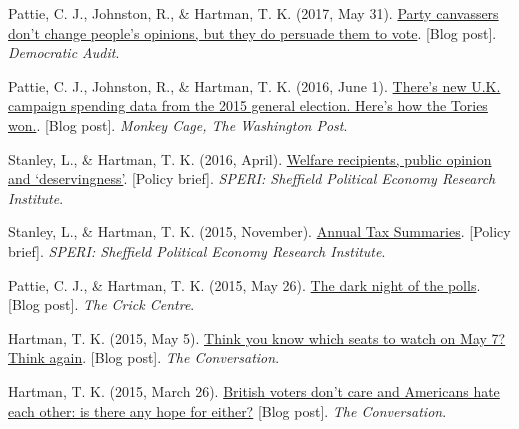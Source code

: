 \documentclass[12pt]{article}
\begin{document}
\begin{bibenum}
	\item Pattie, C. J., Johnston, R., \& Hartman, T. K. (2017, May 31). 
	\href{http://www.democraticaudit.com/2017/05/31/party-canvassers-dont-change-peoples-opinions-but-they-do-persuade-them-to-vote/}{Party canvassers don't change people's opinions, but they do persuade them to vote}. [Blog post]. \textit{Democratic Audit}. 

    \item Pattie, C. J., Johnston, R., \& Hartman, T. K. (2016, June 1). 
    \href{https://www.washingtonpost.com/news/monkey-cage/wp/2016/06/01/theres-new-u-k-campaign-spending-data-from-the-2015-general-election-heres-how-the-tories-won/}
    {There's new U.K. campaign spending data from the 2015 general election. Here's how the Tories won.}. [Blog post]. 
    \textit{Monkey Cage, The Washington Post}.   

    \item Stanley, L., \& Hartman, T. K. (2016, April). 
    \href{http://speri.dept.shef.ac.uk/wp-content/uploads/2016/04/Brief-22-Welfare-recipients-public-opinion-and-deservingness.pdf}
    {Welfare recipients, public opinion and `deservingness'}. [Policy brief]. 
    \textit{SPERI: Sheffield Political Economy Research Institute}.  

    \item Stanley, L., \& Hartman, T. K. (2015, November). 
    \href{http://speri.dept.shef.ac.uk/wp-content/uploads/2015/11/Brief16-The-UK-annual-tax-summaries.pdf}
    {Annual Tax Summaries}. [Policy brief]. 
    \textit{SPERI: Sheffield Political Economy Research Institute}.  
        
    \item Pattie, C. J., \& Hartman, T. K. (2015, May 26). 
    \href{http://www.crickcentre.org/blog/the-dark-night-of-the-polls/}
    {The dark night of the polls}. [Blog post]. 
    \textit{The Crick Centre}.   
   
    \item Hartman, T. K. (2015, May 5). 
    \href{https://theconversation.com/think-you-know-which-seats-to-watch-on-may-7-think-again-41073}
    {Think you know which seats to watch on May 7? Think again}. [Blog post]. 
    \textit{The Conversation}.

    \item Hartman, T. K. (2015, March 26). 
    \href{https://theconversation.com/british-voters-dont-care-and-americans-hate-each-other-is-there-any-hope-for-either-39279}
    {British voters don't care and Americans hate each other: is there any hope for either?} [Blog post]. 
    \textit{The Conversation}.


\end{bibenum}
\end{document}
